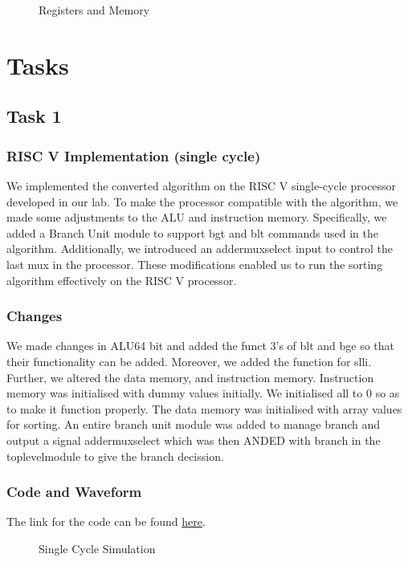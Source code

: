 \documentclass{report}
\begin{document}
\begin{figure}[h]
    \centering
    \caption{Registers and Memory}
    \label{fig: Registers and Memory}
\end{figure}

\chapter{Tasks}
\section{Task 1}
\subsection{RISC V Implementation (single cycle)}

    We implemented the converted algorithm on the RISC V single-cycle processor developed in our lab. To make the processor compatible with the algorithm, we made some adjustments to the ALU and instruction memory. Specifically, we added a Branch Unit module to support bgt and blt commands used in the algorithm. Additionally, we introduced an addermuxselect input to control the last mux in the processor. These modifications enabled us to run the sorting algorithm effectively on the RISC V processor.
    
\subsection{Changes}
    We made changes in ALU64 bit and added the funct 3's of blt and bge so that their functionality can be added. Moreover, we added the function for slli. Further, we altered the data memory, and instruction memory. Instruction memory was initialised with dummy values initially. We initialised all to 0 so as to make it function properly. The data memory was initialised with array values for sorting. An entire branch unit module was added to manage branch and output a signal addermuxselect which was then ANDED with branch in the toplevelmodule to give the branch decission.
    \pagebreak
\subsection{Code and Waveform}
The link for the code can be found \href{https://github.com/AliMuhammadAsad/Computer-Architecture-Spring-23/tree/main/Single%20Cycle%20RISC%20V%20-%20Project%20Task1}{here}.
\begin{figure}[h]
    \centering
    \caption{Single Cycle Simulation}
    \label{fig: Single Cycle Simulation}
\end{figure}
\end{document}
